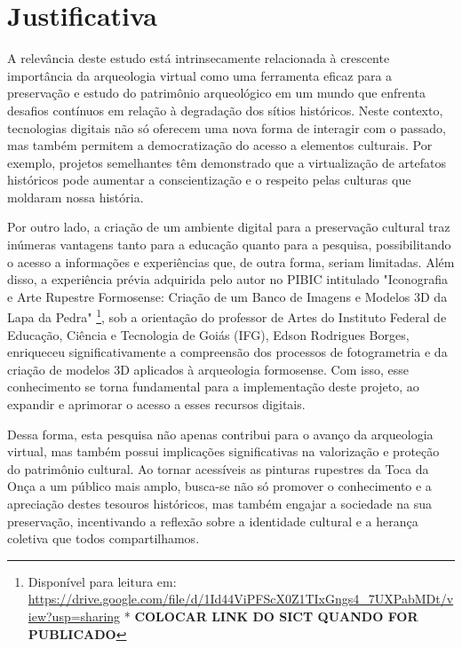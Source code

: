 \section{Justificativa}
A relevância deste estudo está intrinsecamente relacionada à crescente importância da arqueologia virtual como uma ferramenta eficaz para a preservação e estudo do patrimônio arqueológico em um mundo que enfrenta desafios contínuos em relação à degradação dos sítios históricos. Neste contexto, tecnologias digitais não só oferecem uma nova forma de interagir com o passado, mas também permitem a democratização do acesso a elementos culturais. Por exemplo, projetos semelhantes têm demonstrado que a virtualização de artefatos históricos pode aumentar a conscientização e o respeito pelas culturas que moldaram nossa história.

Por outro lado, a criação de um ambiente digital para a preservação cultural traz inúmeras vantagens tanto para a educação quanto para a pesquisa, possibilitando o acesso a informações e experiências que, de outra forma, seriam limitadas. Além disso, a experiência prévia adquirida pelo autor no \gls{PIBIC} intitulado "Iconografia e Arte Rupestre Formosense: Criação de um Banco de Imagens e Modelos \gls{3D} da Lapa da Pedra" \footnote{Disponível para leitura em: 
\href{https://drive.google.com/file/d/1Id44ViPFScX0Z1TIxGngs4_7UXPabMDt/view?usp=sharing}{https://drive.google.com/file/d/1Id44ViPFScX0Z1TIxGngs4_7UXPabMDt/view?usp=sharing} *\textbf{ COLOCAR LINK DO SICT QUANDO FOR PUBLICADO}}, sob a orientação do professor de Artes do  Instituto Federal de Educação, Ciência e Tecnologia de Goiás (IFG), Edson Rodrigues Borges, enriqueceu significativamente a compreensão dos processos de fotogrametria e da criação de modelos 3D aplicados à arqueologia formosense. Com isso, esse conhecimento se torna fundamental para a implementação deste projeto, ao expandir e aprimorar o acesso a esses recursos digitais.

Dessa forma, esta pesquisa não apenas contribui para o avanço da arqueologia virtual, mas também possui implicações significativas na valorização e proteção do patrimônio cultural. Ao tornar acessíveis as pinturas rupestres da Toca da Onça a um público mais amplo, busca-se não só promover o conhecimento e a apreciação destes tesouros históricos, mas também engajar a sociedade na sua preservação, incentivando a reflexão sobre a identidade cultural e a herança coletiva que todos compartilhamos.

